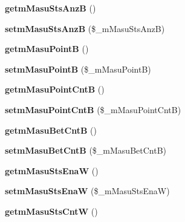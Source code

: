 \begin{DoxyCompactItemize}
\item 
{\bfseries getm\+Masu\+Sts\+AnzB} ()\hypertarget{class_reversi_aba5dc09ce4db9c40e13575e5b10f3ea7}{}\label{class_reversi_aba5dc09ce4db9c40e13575e5b10f3ea7}

\item 
{\bfseries setm\+Masu\+Sts\+AnzB} (\$\+\_\+m\+Masu\+Sts\+AnzB)\hypertarget{class_reversi_ab95634419bbdec6708972b4364a1f7b4}{}\label{class_reversi_ab95634419bbdec6708972b4364a1f7b4}

\item 
{\bfseries getm\+Masu\+PointB} ()\hypertarget{class_reversi_a6d5b9c28b3a92e01b42ed862985d2f98}{}\label{class_reversi_a6d5b9c28b3a92e01b42ed862985d2f98}

\item 
{\bfseries setm\+Masu\+PointB} (\$\+\_\+m\+Masu\+PointB)\hypertarget{class_reversi_ae4fa18aa71c2e6d5c2faed6719bff776}{}\label{class_reversi_ae4fa18aa71c2e6d5c2faed6719bff776}

\item 
{\bfseries getm\+Masu\+Point\+CntB} ()\hypertarget{class_reversi_ae75baf790b7d8b4892f6a2e0f0eb8e67}{}\label{class_reversi_ae75baf790b7d8b4892f6a2e0f0eb8e67}

\item 
{\bfseries setm\+Masu\+Point\+CntB} (\$\+\_\+m\+Masu\+Point\+CntB)\hypertarget{class_reversi_a78f0479c5fa03a015ac9ec6492e05c4f}{}\label{class_reversi_a78f0479c5fa03a015ac9ec6492e05c4f}

\item 
{\bfseries getm\+Masu\+Bet\+CntB} ()\hypertarget{class_reversi_aa0883ee24e29449c6bb89d161521ed67}{}\label{class_reversi_aa0883ee24e29449c6bb89d161521ed67}

\item 
{\bfseries setm\+Masu\+Bet\+CntB} (\$\+\_\+m\+Masu\+Bet\+CntB)\hypertarget{class_reversi_a6243772dbdb1bbe38c01f908457d5743}{}\label{class_reversi_a6243772dbdb1bbe38c01f908457d5743}

\item 
{\bfseries getm\+Masu\+Sts\+EnaW} ()\hypertarget{class_reversi_aefef308965d0fe90daf393d4b0a04184}{}\label{class_reversi_aefef308965d0fe90daf393d4b0a04184}

\item 
{\bfseries setm\+Masu\+Sts\+EnaW} (\$\+\_\+m\+Masu\+Sts\+EnaW)\hypertarget{class_reversi_a230f00edf5b575f24a7094d18123fe4a}{}\label{class_reversi_a230f00edf5b575f24a7094d18123fe4a}

\item 
{\bfseries getm\+Masu\+Sts\+CntW} ()\hypertarget{class_reversi_a04067fac0467af0e096cb3115fa804f4}{}\label{class_reversi_a04067fac0467af0e096cb3115fa804f4}


\end{DoxyCompactItemize}
